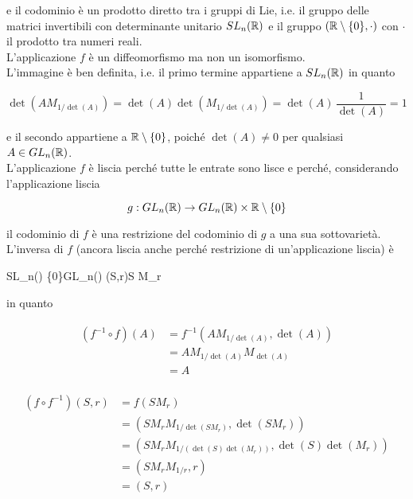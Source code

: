 e il codominio è un prodotto diretto tra i gruppi di Lie, i.e. il gruppo delle matrici invertibili con determinante unitario $ SL_{n}(\mathbb{R}) $ e il gruppo $ (\mathbb{R} \setminus \{0\},\cdot) $ con $ \cdot $ il prodotto tra numeri reali.\\
L'applicazione $ f $ è un diffeomorfismo ma non un isomorfismo.\\
L'immagine è ben definita, i.e. il primo termine appartiene a $ SL_{n}(\mathbb{R}) $ in quanto

\begin{equation}
	\det(A M_{1/\det(A)}) = \det(A) \det(M_{1/\det(A)}) = \det(A) \, \dfrac{1}{\det(A)} = 1
\end{equation}

e il secondo appartiene a $ \mathbb{R} \setminus \{0\} $, poiché $ \det(A) \neq 0 $ per qualsiasi $ A \in GL_{n}(\mathbb{R}) $.\\
L'applicazione $ f $ è liscia perché tutte le entrate sono lisce e perché, considerando l'applicazione liscia

\begin{equation}
	g : GL_{n}(\mathbb{R}) \to GL_{n}(\mathbb{R}) \times \mathbb{R} \setminus \{0\}
\end{equation}
 
il codominio di $ f $ è una restrizione del codominio di $ g $ a una sua sottovarietà.\\
L'inversa di $ f $ (ancora liscia anche perché restrizione di un'applicazione liscia) è

	{SL_{n}(\R) \times \R \setminus \{0\}}{GL_{n}(\R)}
	{(S,r)}{S M_{r}}

in quanto

\begin{align}
	\begin{split}
		(f^{-1} \circ f)(A) &= f^{-1} \left( A M_{1/\det(A)},\det(A) \right) \\
		&= A M_{1/\det(A)} M_{\det(A)} \\
		&= A
	\end{split}
\end{align}

\begin{align}
	\begin{split}
		(f \circ f^{-1})(S,r) &= f(S M_{r}) \\
		&= \left( S M_{r} M_{{1/\det(S M_{r})}},\det(S M_{r}) \right) \\
		&= \left( S M_{r} M_{1/(\det(S) \det(M_{r}))},\det(S) \det(M_{r}) \right) \\
		&= \left( S M_{r} M_{1/r},r \right) \\
		&= (S,r)
	\end{split}
\end{align}

